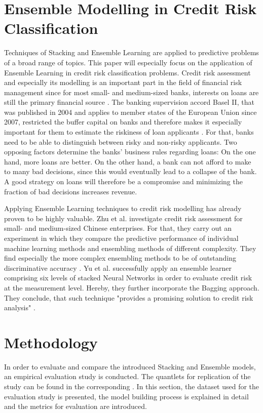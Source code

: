 \documentclass[12pt]{article}
\begin{document}
\section{Ensemble Modelling in Credit Risk Classification}
Techniques of Stacking and Ensemble Learning are applied to predictive problems of a broad range of topics. This paper will especially focus on the application of Ensemble Learning in credit risk classification problems. Credit risk assessment and especially its modelling is an important part in the field of financial risk management since for most small- and medium-sized banks, interests on loans are still the primary financial source \citep[p.2]{jacobson2006internal}. The banking supervision accord Basel II, that was published in 2004 and applies to member states of the European Union since 2007, restricted the buffer capital on banks and therefore makes it especially important for them to estimate the riskiness of loan applicants \citep{basel2}. For that, banks need to be able to distinguish between risky and non-risky applicants. Two opposing factors determine the banks' business rules regarding loans: On the one hand, more loans are better. On the other hand, a bank can not afford to make to many bad decisions, since this would eventually lead to a collapse of the bank. A good strategy on loans will therefore be a compromise and minimizing the fraction of bad decisions increases revenue.

Applying Ensemble Learning techniques to credit risk modelling has already proven to be highly valuable. Zhu et al. \citeyear{zhu2017comparison} investigate credit risk assessment for small- and medium-sized Chinese enterprises. For that, they carry out an experiment in which they compare the predictive performance of individual machine learning methods and ensembling methods of different complexity. They find especially the more complex ensembling methods to be of outstanding discriminative accuracy \citep[p.46f.]{zhu2017comparison}. Yu et al. \citeyear{yu2008credit} successfully apply an ensemble learner comprising six levels of stacked Neural Networks in order to evaluate credit risk at the measurement level. Hereby, they further incorporate the Bagging approach. They conclude, that such technique "provides a promising solution to credit risk analysis" \citep[p.1443]{yu2008credit}. 




\section{Methodology}
In order to evaluate and compare the introduced Stacking and Ensemble models, an empirical evaluation study is conducted. The quantlets for replication of the study can be found 
in the corresponding \href{https://github.com/schreckf/NIC_Schreck}{\color{DarkBlue}{github repository}}. In this section, the dataset used for the evaluation study is presented, the model building process is explained in detail and the metrics for evaluation are introduced.
\end{document}
